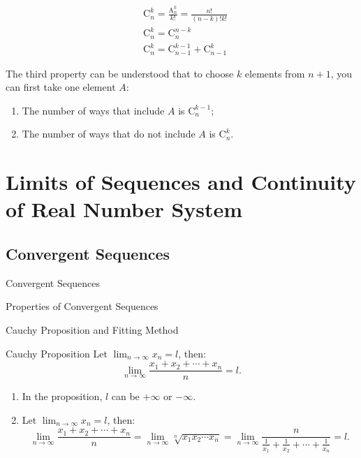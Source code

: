 \documentclass[11pt]{../../TexTemplate/elegantbook}
\begin{document}
\begin{property}
    \begin{align*}
        &\mathrm{C}_{n}^{k} = \frac{\mathrm{A}_{n}^{k}}{k!} = \frac{n!}{(n-k)!k!} \\
        &\mathrm{C}_{n}^{k} = \mathrm{C}_{n}^{n-k} \\
        &\mathrm{C}_{n}^{k} = \mathrm{C}_{n-1}^{k-1} + \mathrm{C}_{n-1}^{k}
    \end{align*}
\end{property}

\begin{remark}
    The third property can be understood that to choose \(k\) elements from \(n+1\), 
    you can first take one element \(A\): 
    \begin{enumerate}
        \item  The number of ways that include \(A\) is \(\mathrm{C}_{n}^{k-1}\); 
        \item  The number of ways that do not include \(A\) is \(\mathrm{C}_{n}^{k}\).
    \end{enumerate}
\end{remark}


\chapter{Limits of Sequences and Continuity of Real Number System} 
\section{Convergent Sequences}
\begin{leftbarTitle}{Convergent Sequences}\end{leftbarTitle}

\begin{leftbarTitle}{Properties of Convergent Sequences}\end{leftbarTitle}



\begin{leftbarTitle}{Cauchy Proposition and Fitting Method}\end{leftbarTitle}
\begin{proposition}{Cauchy Proposition}\label{prop:Cauchy Proposition}
    Let \(\lim_{n \to \infty} x_n = l\), then:
    \[
        \lim_{n \to \infty} \frac{x_{1}+x_{2}+ \cdots +x_{n}}{n} = l.
    \]
\end{proposition}

\begin{note}
    \begin{enumerate}
        \item In the proposition, \(l\) can be \(+\infty\) or \(-\infty\).
        \item Let \(\lim_{n \to \infty} x_n = l\), then:
            \[
                \lim_{n \to \infty}\frac{x_{1}+x_{2}+ \cdots +x_{n}}{n}
                =\lim_{n \to \infty} \sqrt[n]{x_{1} x_{2} \cdots x_{n}} 
                =\lim_{n \to \infty} \frac{n}{\frac{1}{x_{1}} + \frac{1}{x_{2}} + \cdots + \frac{1}{x_{n}}}
                = l.
            \]
    \end{enumerate}
\end{note}
\end{document}

